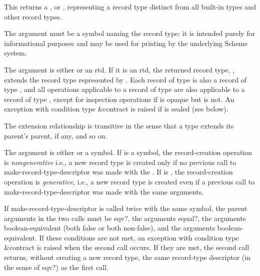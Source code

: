 \begin{entry}{%
}
   
This returns a , or ,
representing a record type distinct from all built-in types and
other record types.

The  argument must be a symbol naming the record type; it is
intended purely for informational purposes and may be used for printing by
the underlying Scheme system.

The  argument is either \schfalse{} or an rtd. If it is an
rtd, the returned record type, , extends the record type
 represented by . Each record of type  is also a
record of type , and all operations applicable to a record of
type  are also applicable to a record of type , except for
inspection operations if  is opaque but  is not. An exception with
condition type {\cf\&contract} is raised if  is sealed (see below).
   
The extension relationship is transitive in the sense that a type extends
its parent's parent, if any, and so on.
   
The  argument is either \schfalse{} or a symbol.
If  is a symbol, the record-creation operation is
\emph{nongenerative} i.e., a new record type is created only
if no previous call to {\cf make-record-type-descriptor}
was made with the .
If  is \schfalse{}, the record-creation operation is
\emph{generative}, i.e., a new record type is created even if
a previous call to {\cf make-record-type-descriptor} was
made with the same arguments.

If {\cf make-record-type-descriptor} is
called twice with the same  symbol, the parent
arguments in the two calls must be {\cf eqv?}, the 
arguments {\cf equal?}, the  arguments boolean-equivalent
(both false or both non-false), and the  arguments
boolean-equivalent.
If these conditions are not met, an exception with condition type
{\cf\&contract} is raised when the second call occurs.
If they are met, the second call returns, without creating a new
record type, the same record-type descriptor
(in the sense of {\cf eqv?}) as the first call.


\end{entry}
